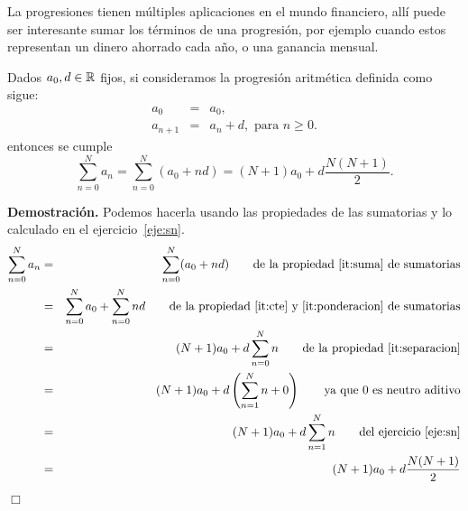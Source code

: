 La progresiones tienen múltiples aplicaciones en el mundo financiero, allí puede ser interesante sumar los términos de una progresión, por ejemplo cuando estos representan un dinero ahorrado cada año, o una ganancia mensual.

\begin{prop}
Dados $a_0, d\in\mathbb{R}$ fijos, si consideramos la progresión aritmética definida como sigue:
\begin{eqnarray*}
a_0&=&a_0,\\
a_{n+1}&=&a_n+d,\textrm{ para }n\ge0.
\end{eqnarray*}
entonces se cumple
$$\sum_{n=0}^Na_n=\sum_{n=0}^N(a_0+nd)=(N+1)a_0+d\frac{N(N+1)}{2}.$$
\end{prop}
{\bf Demostración.}
Podemos hacerla usando las propiedades de las sumatorias y lo calculado en el ejercicio~\ref{eje:sn}.
\begin{eqnarray*}
\sum_{n=0}^Na_n&=&\sum_{n=0}^N(a_0+nd)\qquad \textrm{de la propiedad~\ref{it:suma} de sumatorias}\\
&=&\sum_{n=0}^Na_0+\sum_{n=0}^N nd\qquad \textrm{de la propiedad~\ref{it:cte} y~\ref{it:ponderacion} de sumatorias}\\
&=&(N+1)a_0+d\sum_{n=0}^N n\qquad \textrm{de la propiedad~\ref{it:separacion}}\\
&=&(N+1)a_0+d\left(\sum_{n=1}^N n+0\right)\qquad \textrm{ya que 0 es neutro aditivo}\\
&=&(N+1)a_0+d\sum_{n=1}^N n\qquad \textrm{del ejercicio~\ref{eje:sn}}\\
&=&(N+1)a_0+d\frac{N(N+1)}{2}
\end{eqnarray*}
\hfill $\Box$

